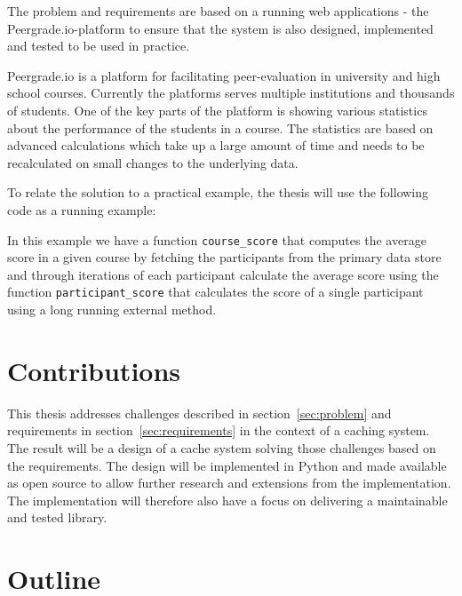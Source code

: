 The problem and requirements are based on a running web applications - the Peergrade.io-platform to ensure that the system is also designed, implemented and tested to be used in practice.

Peergrade.io is a platform for facilitating peer-evaluation in university and high school courses. Currently the platforms serves multiple institutions and thousands of students. One of the key parts of the platform is showing various statistics about the performance of the students in a course. The statistics are based on advanced calculations which take up a large amount of time and needs to be recalculated on small changes to the underlying data.

To relate the solution to a practical example, the thesis will use the following code as a running example:



In this example we have a function \verb$course_score$ that computes the average score in a given course by fetching the participants from the primary data store and through iterations of each participant calculate the average score using the function \verb$participant_score$ that calculates the score of a single participant using a long running external method.


\section{Contributions}
\label{sec:contributions}

This thesis addresses challenges described in section~\ref{sec:problem} and requirements in section~\ref{sec:requirements} in the context of a caching system. The result will be a design of a cache system solving those challenges based on the requirements. The design will be implemented in Python  and made available as open source to allow further research and extensions from the implementation. The implementation will therefore also have a focus on delivering a maintainable and tested library.


\section{Outline}
\label{sec:outline}






